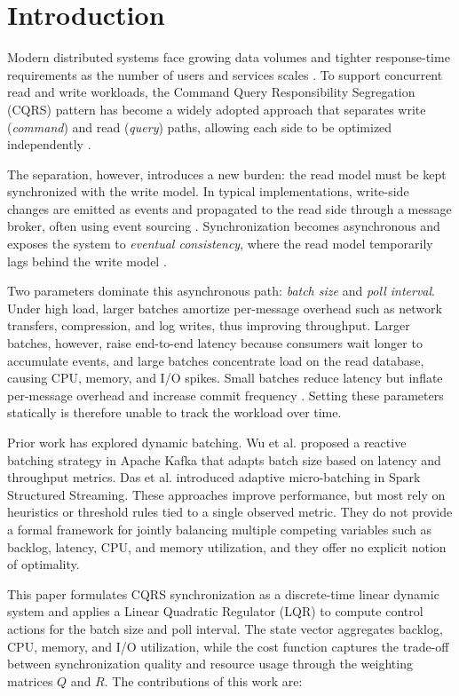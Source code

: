 \section{Introduction}

Modern distributed systems face growing data volumes and tighter response-time requirements as the number of users and services scales \cite{kleppmann2017}. To support concurrent read and write workloads, the Command Query Responsibility Segregation (CQRS) pattern has become a widely adopted approach that separates write (\textit{command}) and read (\textit{query}) paths, allowing each side to be optimized independently \cite{fowler2011,munonye2023}.

The separation, however, introduces a new burden: the read model must be kept synchronized with the write model. In typical implementations, write-side changes are emitted as events and propagated to the read side through a message broker, often using event sourcing \cite{morris2023}. Synchronization becomes asynchronous and exposes the system to \textit{eventual consistency}, where the read model temporarily lags behind the write model \cite{vogels2009,bailis2012}.

Two parameters dominate this asynchronous path: \textit{batch size} and \textit{poll interval}. Under high load, larger batches amortize per-message overhead such as network transfers, compression, and log writes, thus improving throughput. Larger batches, however, raise end-to-end latency because consumers wait longer to accumulate events, and large batches concentrate load on the read database, causing CPU, memory, and I/O spikes. Small batches reduce latency but inflate per-message overhead and increase commit frequency \cite{wu2019,rahman2010}. Setting these parameters statically is therefore unable to track the workload over time.

Prior work has explored dynamic batching. Wu et al. \cite{wu2020} proposed a reactive batching strategy in Apache Kafka that adapts batch size based on latency and throughput metrics. Das et al. \cite{das2018} introduced adaptive micro-batching in Spark Structured Streaming. These approaches improve performance, but most rely on heuristics or threshold rules tied to a single observed metric. They do not provide a formal framework for jointly balancing multiple competing variables such as backlog, latency, CPU, and memory utilization, and they offer no explicit notion of optimality.

This paper formulates CQRS synchronization as a discrete-time linear dynamic system and applies a Linear Quadratic Regulator (LQR) to compute control actions for the batch size and poll interval. The state vector aggregates backlog, CPU, memory, and I/O utilization, while the cost function captures the trade-off between synchronization quality and resource usage through the weighting matrices $Q$ and $R$. The contributions of this work are:

